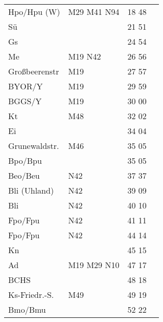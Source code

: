 \begin{tabular}{!{\color{schiefergrau}\vrule width 3pt}*{4}{l!{\color{schiefergrau}\vrule width 3pt}}}
\hline
Hpo/Hpu (W)  & \nuacht{} \mbus{} M29 M41 \nbus{} N94       & 18 48 &             \\
Sü           &                                             & 21 51 &             \\
Gs           &                                             & 24 54 &             \\
Me           & \nusechs{} \mbus{} M19 \nbus{} N42          & 26 56 &             \\
Großbeerenstr& \mbus{} M19                                 & 27 57 &             \\
BYOR/Y       & \mbus{} M19                                 & 29 59 &             \\
BGGS/Y       & \mbus{} M19                                 & 30 00 &             \\
Kt           & \mbus{} M48                                 & 32 02 &             \\
Ei           &                                             & 34 04 &             \\
Grunewaldstr.& \mbus{} M46                                 & 35 05 &             \\
Bpo/Bpu      &                                             & 35 05 &             \\
Beo/Beu      & \nuneun{} \nbus{} N42                       & 37 37 &             \\
Bli (Uhland) & \nbus{} N42                                 & 39 09 &             \\
Bli          & \nbus{} N42                                 & 40 10 &             \\
Fpo/Fpu      & \nudrei{} \nbus{} N42                       & 41 11 &             \\
\hline
Fpo/Fpu      & \nudrei{} \nbus{} N42                       & 44 14 &             \\
Kn           &                                             & 45 15 &             \\
Ad           & \mbus{} M19 M29 \nbus{} N10                 & 47 17 &             \\
BCHS         &                                             & 48 18 &             \\
Ks-Friedr.-S.& \mbus{} M49                                 & 49 19 &             \\
Bmo/Bmu      & \nuzwei{}                                   & 52 22 &             \\

\end{tabular}
